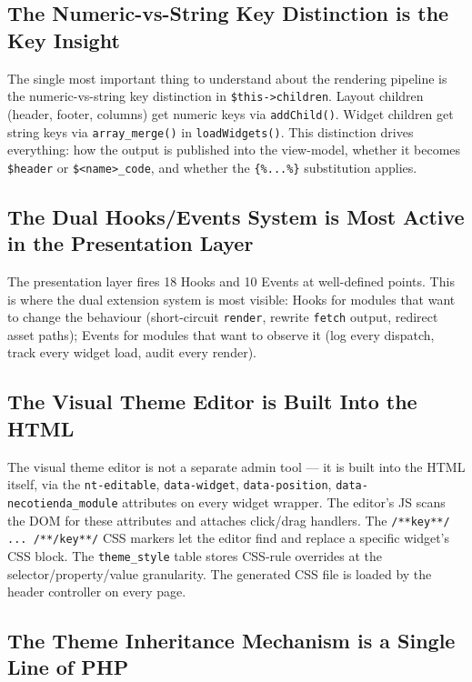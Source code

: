 \documentclass[11pt,a4paper]{article}
\begin{document}
\subsection{The Numeric-vs-String Key Distinction is the Key Insight}

The single most important thing to understand about the rendering
pipeline is the numeric-vs-string key distinction in
\texttt{\$this->children}. Layout children (header, footer,
columns) get numeric keys via \texttt{addChild()}. Widget children
get string keys via \texttt{array\_merge()} in
\texttt{loadWidgets()}. This distinction drives everything: how
the output is published into the view-model, whether it becomes
\texttt{\$header} or \texttt{\$<name>\_code}, and whether the
\texttt{\{\%...\%\}} substitution applies.

\subsection{The Dual Hooks/Events System is Most Active in the Presentation Layer}

The presentation layer fires 18 Hooks and 10 Events at well-defined
points. This is where the dual extension system is most visible:
Hooks for modules that want to change the behaviour (short-circuit
\texttt{render}, rewrite \texttt{fetch} output, redirect asset
paths); Events for modules that want to observe it (log every
dispatch, track every widget load, audit every render).

\subsection{The Visual Theme Editor is Built Into the HTML}

The visual theme editor is not a separate admin tool --- it is
built into the HTML itself, via the \texttt{nt-editable},
\texttt{data-widget}, \texttt{data-position},
\texttt{data-necotienda\_module} attributes on every widget
wrapper. The editor's JS scans the DOM for these attributes and
attaches click/drag handlers. The \texttt{/**key**/ ... /**/key**/}
CSS markers let the editor find and replace a specific widget's
CSS block. The \texttt{theme\_style} table stores CSS-rule
overrides at the selector/property/value granularity. The
generated CSS file is loaded by the header controller on every
page.

\subsection{The Theme Inheritance Mechanism is a Single Line of PHP}
\end{document}
